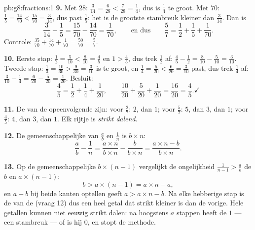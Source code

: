 \begin{solution}{pb:g8:fractions:1}
\textbf{9.} Met  $28$: $\frac{3}{14} = \frac{6}{28} < \frac{7}{28} = \frac14$,
dus is $\frac14$ te groot. Met  $70$: $\frac15 = \frac{14}{70} <
\frac{15}{70} = \frac{3}{14}$, dus past $\frac15$: het is de grootste stambreuk
kleiner dan $\frac{3}{14}$. Dan is
\[
\frac{3}{14} - \frac15 = \frac{15}{70} - \frac{14}{70}
= \frac{1}{70},
\qquad\text{en dus}\qquad
\frac57 = \frac12 + \frac15 + \frac{1}{70} .
\]
Controle: $\frac{35}{70} + \frac{14}{70} + \frac{1}{70} = \frac{50}{70} = \frac57$.

\textbf{10.} Eerste stap: $\frac12 = \frac{5}{10} < \frac{8}{10} = \frac45$ en
$1 > \frac45$, dus trek $\frac12$ af:
$\frac45 - \frac12 = \frac{8}{10} - \frac{5}{10} = \frac{3}{10}$. Tweede stap:
$\frac13 = \frac{10}{30} > \frac{9}{30} = \frac{3}{10}$ is te groot, en
$\frac14 = \frac{5}{20} < \frac{6}{20} = \frac{3}{10}$ past, dus trek $\frac14$ af:
$\frac{3}{10} - \frac14 = \frac{6}{20} - \frac{5}{20} = \frac{1}{20}$. Besluit:
\[
\frac45 = \frac12 + \frac14 + \frac{1}{20},
\qquad
\frac{10}{20} + \frac{5}{20} + \frac{1}{20} = \frac{16}{20}
= \frac45 . \checkmark
\]

\textbf{11.} De  van de opeenvolgende  zijn: voor $\frac27$: $2$, dan
$1$; voor $\frac57$: $5$, dan $3$, dan $1$; voor $\frac45$: $4$, dan $3$, dan $1$. Elk
rijtje is \emph{strikt dalend}.

\textbf{12.} De gemeenschappelijke  van $\frac ab$ en $\frac1n$ is
$b \times n$:
\[
\frac{a}{b} - \frac{1}{n}
= \frac{a \times n}{b \times n} - \frac{b}{b \times n}
= \frac{a \times n - b}{b \times n} .
\]

\textbf{13.} Op de gemeenschappelijke  $b \times (n-1)$ vergelijkt de
ongelijkheid $\frac{1}{n-1} > \frac ab$ de  $b$ en $a \times (n - 1)$:
\[
b > a \times (n - 1) = a \times n - a ,
\]
en $a - b$ bij beide kanten optellen geeft $a > a \times n - b$. Na elke hebberige stap
is de  van de  (vraag 12) dus een heel getal dat strikt kleiner is dan de
vorige. Hele getallen kunnen niet eeuwig strikt dalen: na hoogstens $a$ stappen heeft de
  $1$ --- een stambreuk --- of is hij $0$, en stopt de methode.


\end{solution}

